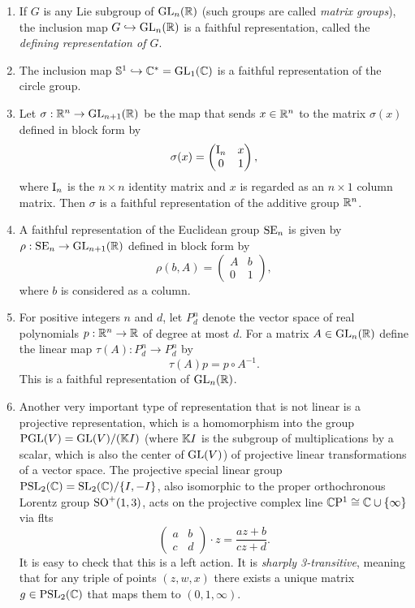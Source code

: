 \begin{example}\label{ex Lie group representations}
    \begin{enumerate}[label=(\alph*)]
        \item If $G$ is any Lie subgroup of $\operatorname{GL}_n(\mathbb{R})$ (such groups are called \emph{matrix groups}), the inclusion map $G\hookrightarrow \operatorname{GL}_n(\mathbb{R})$ is a faithful representation, called the \emph{defining representation of $G$}.
        \item The inclusion map $\mathbb{S}^1\hookrightarrow\mathbb{C}^\ast=\operatorname{GL}_1(\mathbb{C})$ is a faithful representation of the circle group.
        \item Let $\sigma:\mathbb{R}^n\to \operatorname{GL}_{n+1}(\mathbb{R})$ be the map that sends $x\in\mathbb{R}^n$ to the matrix $\sigma(x)$ defined in block form by 
        \[\sigma(x)=\begin{pmatrix}
            \mathrm{I}_n & x\\
            0 & 1
        \end{pmatrix},\]
        where $\mathrm{I}_n$ is the $n\times n$ identity matrix and $x$ is regarded as an $n\times 1$  column matrix. Then $\sigma$ is a faithful representation of the additive group $\mathbb{R}^n$.
        \item A faithful representation of the Euclidean group $\operatorname{SE}_n$ is given by $\rho:\operatorname{SE}_n\to \operatorname{GL}_{n+1}(\mathbb{R})$ defined in block form by
        \[\rho(b,A)=\begin{pmatrix}
            A & b\\
            0 & 1
        \end{pmatrix},
        \]
        where $b$ is considered as a column.
        \item For positive integers $n$ and $d$, let $P^n_d$ denote the vector space of real polynomials $p:\mathbb{R}^n\to \mathbb{R}$ of degree at most $d$. For a matrix $A\in\operatorname{GL}_n(\mathbb{R})$ define the linear map $\tau(A):P^n_d\to P^n_d$ by
        \[\tau(A)p=p\circ A^{-1}.\]
        This is a faithful representation of $\operatorname{GL}_n(\mathbb{R})$.

        \item Another very important type of representation that is not linear is a projective representation, which is a homomorphism into the group $\operatorname{PGL}(V)=\operatorname{GL}(V)\slash (\mathbb{K} I)$ (where $\mathbb{K} I$ is the subgroup of multiplications by a scalar, which is also the center of $\operatorname{GL}(V)$) of projective linear transformations of a vector space. The projective special linear group $\operatorname{PSL}_2(\mathbb{C})=\operatorname{SL}_2(\mathbb{C})\slash\{I,-I\}$, also isomorphic to the proper orthochronous Lorentz group $\operatorname{SO}^+(1,3)$, acts on the projective complex line $\mathbb{C}\mathrm{P}^1\cong \mathbb{C}\cup\{\infty\}$ via \glspl{flt}
        \[\begin{pmatrix}
            a & b\\
            c& d
        \end{pmatrix} \cdot z=\frac{az+b}{cz+d}.\]
        It is easy to check that this is a left action. It is \emph{sharply 3-transitive}, meaning that for any triple of points $(z,w,x)$ there exists a unique matrix $g\in \operatorname{PSL}_2(\mathbb{C})$ that maps them to $(0,1,\infty)$.
    \end{enumerate}
\end{example}

